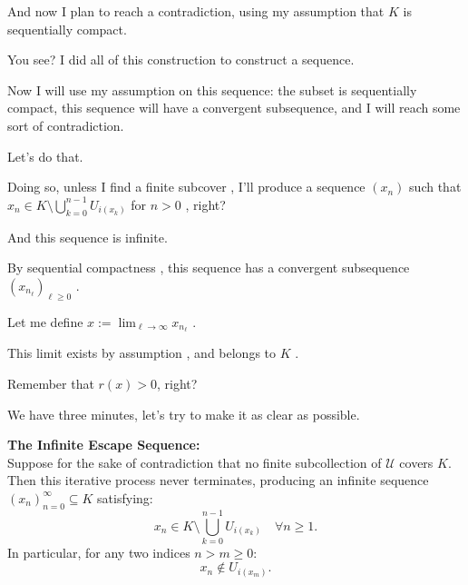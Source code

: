 \begin{proofWrapper}
\begin{speech}[01:18:11 - 01:19:21]
And now I plan to reach a contradiction, using my assumption that $K$ is sequentially compact.

You see? I did all of this construction to construct a sequence.

Now I will use my assumption on this sequence: the subset is sequentially compact, this sequence will have a convergent subsequence, and I will reach some sort of contradiction.

Let's do that.
\end{speech}

\begin{speech}[01:19:21 - 01:21:33]
Doing so, unless I find a finite subcover , I'll produce a sequence  $(x_n)$ such that $x_n \in K \setminus \bigcup_{k=0}^{n-1} U_{i(x_k)}$ for $n > 0$ , right?

And this sequence is infinite.

By sequential compactness , this sequence has a convergent subsequence $(x_{n_\ell})_{\ell \ge 0}$ .

Let me define $x := \lim_{\ell \to \infty} x_{n_\ell}$ .

This limit exists by assumption , and belongs to $K$ .

Remember that $r(x) > 0$, right? 

We have three minutes, let's try to make it as clear as possible.
\end{speech}

\begin{content}
\textbf{The Infinite Escape Sequence:} \\
Suppose for the sake of contradiction that no finite subcollection of $\mathcal{U}$ covers $K$. Then this iterative process never terminates, producing an infinite sequence $(x_n)_{n=0}^\infty \subseteq K$ satisfying:
\begin{equation}\label{eq:escape-property}
x_n \in K \setminus \bigcup_{k=0}^{n-1} U_{i(x_k)} \quad \forall n \ge 1.
\end{equation}
In particular, for any two indices $n > m \ge 0$:
\begin{equation}\label{eq:disjoint-point-set}
x_n \notin U_{i(x_m)}.
\end{equation}


\end{content}
\end{proofWrapper}
